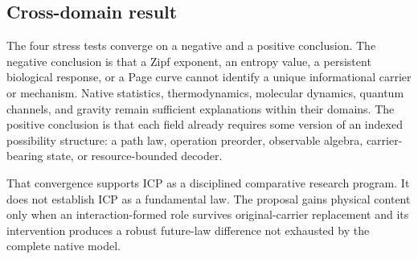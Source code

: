 \subsection{Cross-domain result}

The four stress tests converge on a negative and a positive conclusion.  The
negative conclusion is that a Zipf exponent, an entropy value, a persistent
biological response, or a Page curve cannot identify a unique informational
carrier or mechanism.  Native statistics, thermodynamics, molecular dynamics,
quantum channels, and gravity remain sufficient explanations within their
domains.  The positive conclusion is that each field already requires some
version of an indexed possibility structure: a path law, operation preorder,
observable algebra, carrier-bearing state, or resource-bounded decoder.

That convergence supports ICP as a disciplined comparative research program.
It does not establish ICP as a fundamental law.  The proposal gains physical
content only when an interaction-formed role survives original-carrier
replacement and its intervention produces a robust future-law difference not
exhausted by the complete native model.
